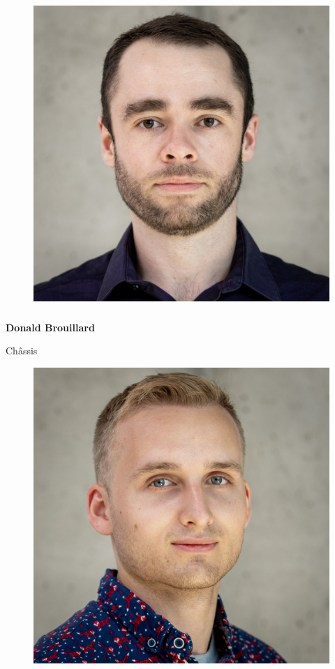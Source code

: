 \documentclass[a0paper,portrait]{baposter}
\begin{document}
\begin{poster}
{\begin{figure}
\includegraphics[width=.9\linewidth]{img/membres/Donald-Brouillard-2.jpg} 
\end{figure}
\subsubsection*{}
\vspace{2mm}
\textbf{Donald Brouillard}

Ch\^assis

\begin{figure}
\includegraphics[width=.9\linewidth]{img/membres/Marco-Roger-3.jpg} 
\end{figure}
}
\end{poster}
\end{document}
